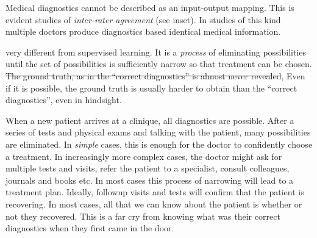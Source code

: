 \documentclass[11pt]{pnas-new}
\begin{document}
  Medical diagnostics cannot be described as an input-output
  mapping. This is evident studies of {\em inter-rater agreement} (see
  inset). In studies of this kind multiple doctors produce diagnostics
  based identical medical information. 

  



  very different from supervised learning. It is
a {\em process} of eliminating possibilities
until the set of possibilities is sufficiently narrow so that
treatment can be chosen. \sout{The ground truth, as in the ``correct
diagnostics'' is almost never revealed}, {\color{blue}Even if it is possible, the ground truth is usually harder to obtain than the ``correct diagnostics'',} even in {\color{blue}hindsight}.

When a new patient arrives at a clinique, all diagnostics are
possible. After a {\color{blue}series of tests and} physical exams and talking with the patient, many
possibilities are eliminated. In {\em simple} cases, this is enough
for the doctor to confidently choose a treatment. In increasingly more complex
cases, the doctor might ask for multiple tests and visits, refer the
patient to a specialist, consult colleagues, journals and books
etc. In most cases this process of narrowing will lead to a treatment
plan. Ideally, followup visits and tests will confirm that the patient
is recovering. In most cases, all that we can know about the patient
is whether or not they recovered. This is a far cry from knowing what
was their correct diagnostics when they first came in the door.
\end{document}
